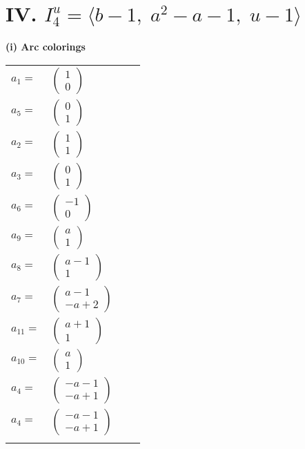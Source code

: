 \documentclass[1p]{elsarticle_modified}
\theoremstyle{definition}
\begin{document}
\centering \section*{IV. $I^u_{4}= \langle b-1,\;a^2- a-1,\;u-1 \rangle$}
\flushleft \textbf{(i) Arc colorings}\\
\begin{tabular}{m{7pt} m{180pt} m{7pt} m{180pt} }
\flushright $a_{1}=$&$\begin{pmatrix}1\\0\end{pmatrix}$ \\
\flushright $a_{5}=$&$\begin{pmatrix}0\\1\end{pmatrix}$ \\
\flushright $a_{2}=$&$\begin{pmatrix}1\\1\end{pmatrix}$ \\
\flushright $a_{3}=$&$\begin{pmatrix}0\\1\end{pmatrix}$ \\
\flushright $a_{6}=$&$\begin{pmatrix}-1\\0\end{pmatrix}$ \\
\flushright $a_{9}=$&$\begin{pmatrix}a\\1\end{pmatrix}$ \\
\flushright $a_{8}=$&$\begin{pmatrix}a-1\\1\end{pmatrix}$ \\
\flushright $a_{7}=$&$\begin{pmatrix}a-1\\- a+2\end{pmatrix}$ \\
\flushright $a_{11}=$&$\begin{pmatrix}a+1\\1\end{pmatrix}$ \\
\flushright $a_{10}=$&$\begin{pmatrix}a\\1\end{pmatrix}$ \\
\flushright $a_{4}=$&$\begin{pmatrix}- a-1\\- a+1\end{pmatrix}$\\ \flushright $a_{4}=$&$\begin{pmatrix}- a-1\\- a+1\end{pmatrix}$\\&\end{tabular}
\end{document}
